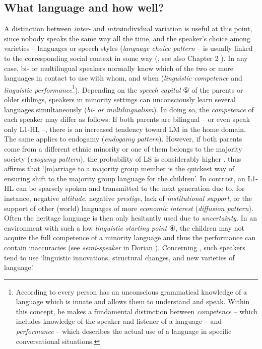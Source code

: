 \documentclass[output=paper,
modfonts
]{langscibook}
\begin{document}
\subsection*{What language and how well?}

A distinction between \emph{inter}- and \emph{intra}individual variation is useful at this point, since nobody speaks the same way all the time, and the speaker's choice among varieties -- languages or speech styles (\emph{language choice pattern} -- is usually linked to the corresponding social context in some way (\cite[12-17]{Gal1979}, see also Chapter 2
). In any case, bi- or multilingual speakers normally know which of the two or more languages in contact to use with whom, and when (\emph{linguistic competence} and \emph{linguistic performance}\footnote{According to \cite[3]{Chomsky1965} every person has an unconscious grammatical knowledge of a language which is innate and allows them to understand and speak. Within this concept, he makes a fundamental distinction between \emph{competence} -- which includes knowledge of the speaker and listener of a language -- and \emph{performance} -- which describes the actual use of a language in specific conversational situations.}). Depending on the \emph{speech capital} ⑤ of the parents or older siblings, speakers in minority settings can unconsciously learn several languages simultaneously (\emph{bi- or multilingualism}).  In doing so, the \emph{competence} of each speaker may differ as follows: If both parents are bilingual -- or even speak only L1-HL --, there is an increased tendency toward LM in the home domain. The same applies to endogamy (\emph{endogamy pattern}). However, if both parents come from a different ethnic minority or one of them belongs to the majority society (\emph{exogamy pattern}), the probability of LS is considerably higher \parencite[89]{Pauwels2016}. \cite[65]{Holmes2013} thus affirms that ‘{[}m{]}arriage to a majority group member is the quickest way of ensuring shift to the majority group language for the children’. In contrast, an L1-HL can be sparsely spoken and transmitted to the next generation due to, for instance, negative \emph{attitude}, negative \emph{prestige}, lack of \emph{institutional support}, or  the support of other (world) languages of more \emph{economic interest} (\emph{diffusion pattern}). Often the heritage language is then only hesitantly used due to \emph{uncertainty}. In an environment with such a low \emph{linguistic starting point} ④, the children may not acquire the full competence of a minority language and thus the performance can contain inaccuracies (see \emph{semi-speaker} in Dorian \citeyear[87]{Dorian1980}). Concerning \cite[116]{Wei2002}, such speakers tend to use ‘linguistic innovations, structural changes, and new varieties of language’. 
\end{document}
